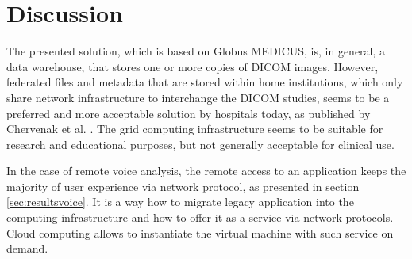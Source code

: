 \chapter{Discussion}
\label{sec:discussion}



The presented solution, which is based on Globus MEDICUS, is, in general, a data warehouse, that stores one or more copies of DICOM images. However, federated files and metadata that are stored within home institutions, which only share network infrastructure to interchange the DICOM studies, seems to be a preferred and more acceptable solution by hospitals today, as published by Chervenak et al. \cite{Chervenak2012}. The grid computing infrastructure seems to be suitable for research and educational purposes, but not generally acceptable for clinical use. 
 
In the case of remote voice analysis, the remote access to an application keeps the majority of user experience via network protocol, as presented in section \ref{sec:resultsvoice}. It is a way how to migrate legacy application into the computing infrastructure and how to offer it as a service via network protocols. Cloud computing allows to instantiate the virtual machine with such service on demand.


